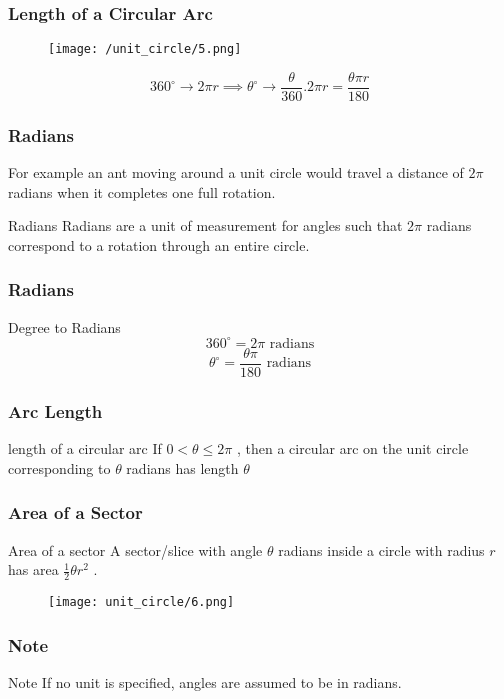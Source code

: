 \begin{frame}
    \frametitle{Length of a Circular Arc}
    \begin{figure}
        \centering
        \texttt{[image: /unit\_circle/5.png]}
    \end{figure}
    \[ 360^{\circ}   \rightarrow  2 \pi r \implies \theta^{\circ}  \rightarrow \frac{\theta}{360}.2\pi r  = \frac{\theta \pi r}{180}\] 
\end{frame}

\begin{frame}
    \frametitle{Radians}
    For example an ant moving around a unit circle would travel a distance of $2\pi$ radians when it completes one full rotation.
    \begin{block}{Radians}
        Radians are a unit of measurement for angles such that $2\pi$ radians correspond to a rotation through an entire circle.
    \end{block}
\end{frame}

\begin{frame}
    \frametitle{Radians}
    \begin{block}{Degree to Radians}
        \[ 360^{\circ} = 2 \pi \text{ radians} \]
        \[ \theta ^{\circ}  = \frac{\theta \pi}{180} \text{ radians} \]
    \end{block}
\end{frame}

\begin{frame}
    \frametitle{Arc Length}
    \begin{block}{length of a circular arc}
        If $0 < \theta \leq 2\pi$ , then a circular arc on the unit circle corresponding to $\theta$ radians has length $\theta$         
    \end{block}
\end{frame}

\begin{frame}
    \frametitle{Area of a Sector}
    \begin{block}{Area of a sector}
        A sector/slice with angle $\theta$ radians inside a circle with radius $r$ has area $\frac{1}{2} \theta r^{2}$ .
    \end{block}
    \begin{figure}[h]    
        \centering
        \texttt{[image: unit\_circle/6.png]}
    \end{figure}
\end{frame}

\begin{frame}
    \frametitle{Note}
    \begin{block}{Note}
        If no unit is specified, angles are assumed to be in radians.
    \end{block}
\end{frame}

